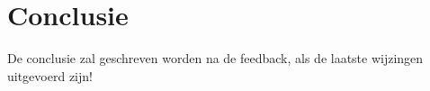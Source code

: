 \documentclass[pdftex,a4paper,12pt]{report}
\begin{document}
\chapter{Conclusie}
\label{ch:conclusie}

De conclusie zal geschreven worden na de feedback, als de laatste wijzingen uitgevoerd zijn!






\listoffigures
\listoftables
\end{document}
